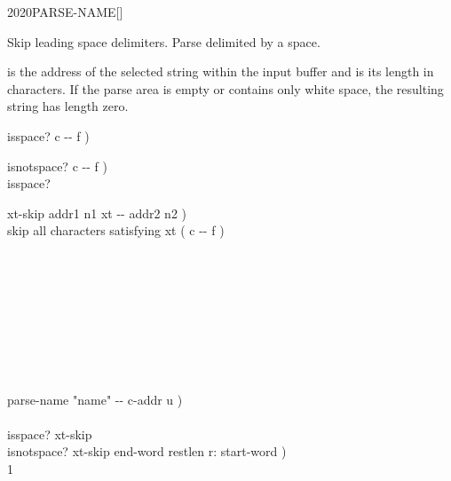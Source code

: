 \vspace*{-3ex}
\begin{worddef}{2020}{PARSE-NAME}[]%
\item {}

	Skip leading space delimiters. Parse  delimited by a
	space.

	 is the address of the selected string within the
	input buffer and  is its length in characters. If the
	parse area is empty or contains only white space, the resulting
	string has length zero.

	\begin{implement} %
		\word{:} isspace?  c -{}- f ) \\
		\tab {}   \word{;}

		\word{:} isnotspace?  c -{}- f ) \\
		\tab isspace?  \word{;}

		\word{:} xt-skip  addr1 n1 xt -{}- addr2 n2 ) \\
		\tab {} skip all characters satisfying xt ( c -{}- f ) \\
		\tab {} \\
		\tab {} \\
		\tab[2]  \\
		\tab {} \\
		\tab[2]     \\
		\tab {} \\
		  \\
		\tab {}  \\
		\tab {}  \word{;}

		\word{:} parse-name  "name" -{}- c-addr u ) \\
		\tab {}    \\
		\tab \word{[']} isspace? xt-skip   \\
		\tab \word{[']} isnotspace? xt-skip  end-word restlen r: start-word ) \\
		\tab {} 1  \word{+}   \word{-}  \word{!} \\
		\tab {}   \word{-} \word{;}
	\end{implement}


\end{worddef}

